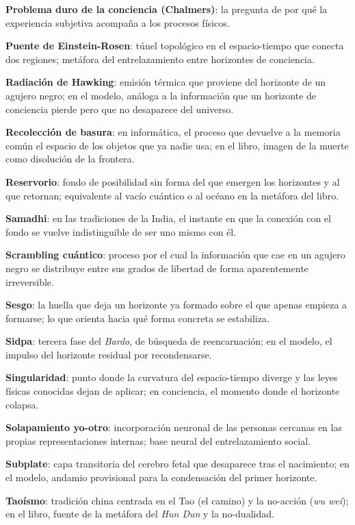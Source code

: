 \glos \textbf{Problema duro de la conciencia (Chalmers)}: la pregunta de por qué la experiencia subjetiva acompaña a los procesos físicos.

\glos \textbf{Puente de Einstein-Rosen}: túnel topológico en el espacio-tiempo que conecta dos regiones; metáfora del entrelazamiento entre horizontes de conciencia.

\glos \textbf{Radiación de Hawking}: emisión térmica que proviene del horizonte de un agujero negro; en el modelo, análoga a la información que un horizonte de conciencia pierde pero que no desaparece del universo.

\glos \textbf{Recolección de basura}: en informática, el proceso que devuelve a la memoria común el espacio de los objetos que ya nadie usa; en el libro, imagen de la muerte como disolución de la frontera.

\glos \textbf{Reservorio}: fondo de posibilidad sin forma del que emergen los horizontes y al que retornan; equivalente al vacío cuántico o al océano en la metáfora del libro.

\glos \textbf{Samadhi}: en las tradiciones de la India, el instante en que la conexión con el fondo se vuelve indistinguible de ser uno mismo con él.

\glos \textbf{Scrambling cuántico}: proceso por el cual la información que cae en un agujero negro se distribuye entre sus grados de libertad de forma aparentemente irreversible.

\glos \textbf{Sesgo}: la huella que deja un horizonte ya formado sobre el que apenas empieza a formarse; lo que orienta hacia qué forma concreta se estabiliza.

\glos \textbf{Sidpa}: tercera fase del \emph{Bardo}, de búsqueda de reencarnación; en el modelo, el impulso del horizonte residual por recondensarse.

\glos \textbf{Singularidad}: punto donde la curvatura del espacio-tiempo diverge y las leyes físicas conocidas dejan de aplicar; en conciencia, el momento donde el horizonte colapsa.

\glos \textbf{Solapamiento yo-otro}: incorporación neuronal de las personas cercanas en las propias representaciones internas; base neural del entrelazamiento social.

\glos \textbf{Subplate}: capa transitoria del cerebro fetal que desaparece tras el nacimiento; en el modelo, andamio provisional para la condensación del primer horizonte.

\glos \textbf{Taoísmo}: tradición china centrada en el Tao (el camino) y la no-acción (\emph{wu wei}); en el libro, fuente de la metáfora del \emph{Hun Dun} y la no-dualidad.

